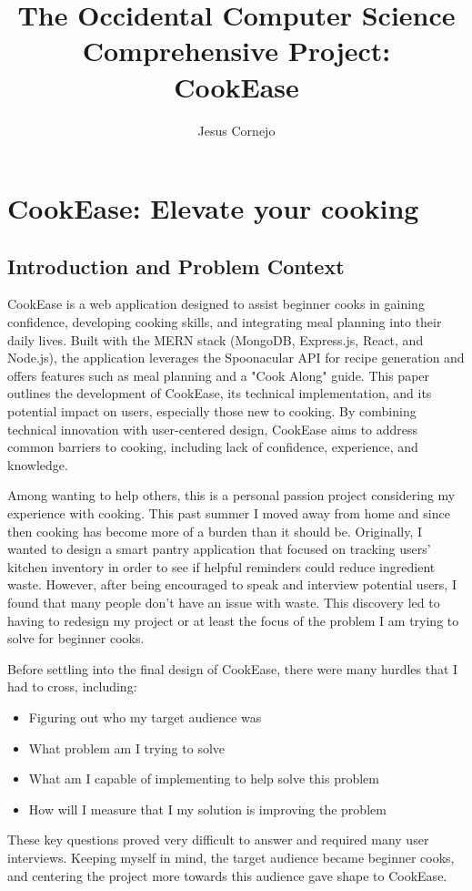 \documentclass[10pt,twocolumn]{article}
\title{The Occidental Computer Science Comprehensive Project: \\ CookEase}
\author{Jesus Cornejo}
\affiliation{Occidental College}
\begin{document}
\maketitle

\section{CookEase: Elevate your cooking}

\subsection{Introduction and Problem Context}
CookEase is a web application designed to assist beginner cooks in gaining confidence, developing cooking skills, and integrating meal planning into their daily lives. Built with the MERN stack (MongoDB, Express.js, React, and Node.js), the application leverages the Spoonacular API for recipe generation and offers features such as meal planning and a "Cook Along" guide. This paper outlines the development of CookEase, its technical implementation, and its potential impact on users, especially those new to cooking. By combining technical innovation with user-centered design, CookEase aims to address common barriers to cooking, including lack of confidence, experience, and knowledge.

Among wanting to help others, this is a personal passion project considering my experience with cooking. This past summer I moved away from home and since then cooking has become more of a burden than it should be. Originally, I wanted to design a smart pantry application that focused on tracking users' kitchen inventory in order to see if helpful reminders could reduce ingredient waste. However, after being encouraged to speak and interview potential users, I found that many people don't have an issue with waste. This discovery led to having to redesign my project or at least the focus of the problem I am trying to solve for beginner cooks. 

Before settling into the final design of CookEase, there were many hurdles that I had to cross, including:
\begin{itemize}
    \item Figuring out who my target audience was
    \item What problem am I trying to solve
    \item What am I capable of implementing to help solve this problem
    \item How will I measure that I my solution is improving the problem
\end{itemize}
These key questions proved very difficult to answer and required many user interviews. Keeping myself in mind, the target audience became beginner cooks, and centering the project more towards this audience gave shape to CookEase. 
\end{document}
